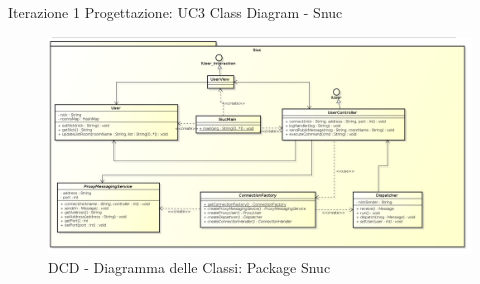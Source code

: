 \documentclass[t]{beamer} %
\begin{document}
\begin{frame} {Iterazione 1 Progettazione: UC3 Class Diagram - Snuc}
   \begin{figure}
     \includegraphics[scale=0.24]{image_astah/Iteration_2_DesignModel/ClassDiagramSnuc.png}{\centering}
     \caption{DCD - Diagramma delle Classi: Package Snuc }
     \label{fig_UC3_DCD_3} 
   \end{figure}
\end{frame}
\end{document}
